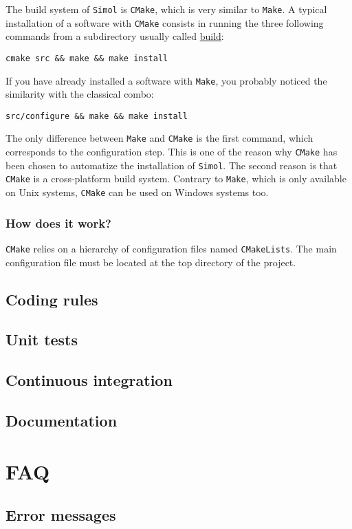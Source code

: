 \documentclass[12pt]{book}
\newcommand{\CMake}{\texttt{CMake}\xspace}
\newcommand{\CMakeLists}{\texttt{CMakeLists}\xspace}
\newcommand{\Make}{\texttt{Make}\xspace}
\newcommand{\Simol}{\texttt{Simol}\xspace}
\begin{document}
The build system of \Simol is \CMake, which is very similar to \Make. A typical installation of a software with \CMake consists in running the three following commands from a subdirectory usually called \url{build}: 
\lstset{language=bash} 
\begin{lstlisting}
cmake src && make && make install
\end{lstlisting}
If you have already installed a software with \Make, you probably noticed the similarity with the classical combo:
\lstset{language=bash} 
\begin{lstlisting}
src/configure && make && make install
\end{lstlisting}
The only difference between \Make and \CMake is the first command, which corresponds to the configuration step. This is one of the reason why \CMake has been chosen to automatize the installation of \Simol. The second reason is that \CMake is a cross-platform build system. Contrary to \Make, which is only available on Unix systems, \CMake can be used on Windows systems too.

\subsection{How does it work?}

\CMake relies on a hierarchy of configuration files named \CMakeLists. The main configuration file must be located at the top directory of the project.



\section{Coding rules}
\section{Unit tests}
\section{Continuous integration}
\section{Documentation}


\chapter{FAQ}

\section{Error messages}
\end{document}
